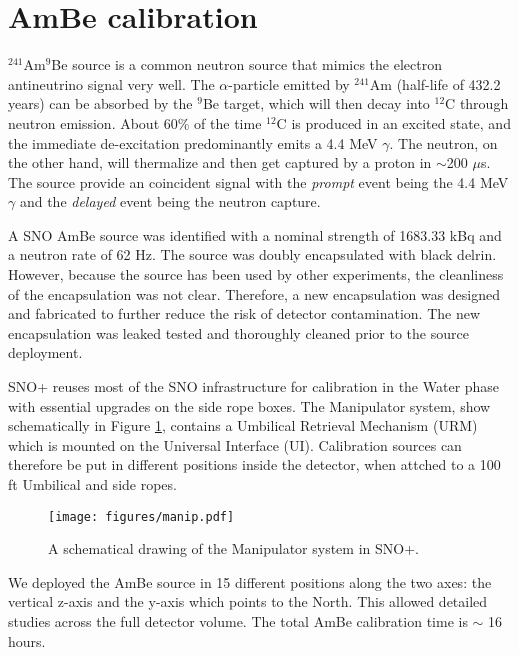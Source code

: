 \documentclass[a4paper]{jpconf}
\begin{document}
\section{AmBe calibration}


$^{241}$Am$^{9}$Be source is a common neutron source that mimics the electron antineutrino signal very well. The $\alpha$-particle emitted by $^{241}$Am (half-life of 432.2 years) can be absorbed by the $^{9}$Be target, which will then decay into $^{12}$C through neutron emission. About 60\% of the time $^{12}$C is produced in an excited state, and the immediate de-excitation predominantly emits a 4.4 MeV $\gamma$. The neutron, on the other hand, will thermalize and then get captured by a proton in $\sim$200 $\mu$s. The source provide an coincident signal with the \textit{prompt} event being the 4.4 MeV $\gamma$ and the \textit{delayed} event being the neutron capture.

A SNO AmBe source was identified with a nominal strength of 1683.33 kBq and a neutron rate of 62 Hz\cite{jloach2009:diss}. The source was doubly encapsulated with black delrin. However, because the source has been used by other experiments, the cleanliness of the encapsulation was not clear. Therefore, a new encapsulation was designed and fabricated to further reduce the risk of detector contamination. The new encapsulation was leaked tested and thoroughly cleaned prior to the source deployment.

SNO+ reuses most of the SNO infrastructure for calibration\cite{Moffat:2005tq} in the Water phase with essential upgrades on the side rope boxes. The Manipulator system, show schematically in Figure \ref{fig:1}, contains a Umbilical Retrieval Mechanism (URM) which is mounted on the Universal Interface (UI). Calibration sources can therefore be put in different positions inside the detector, when attched to a 100 ft Umbilical and side ropes. 

\begin{figure}[h]
\texttt{[image: figures/manip.pdf]}\hspace{2pc}%
\begin{minipage}[b]{14pc}\caption{\label{fig:1}A schematical drawing of the Manipulator system in SNO+.}
\end{minipage}
\end{figure}

We deployed the AmBe source in 15 different positions along the two axes: the vertical z-axis and the y-axis which points to the North. This allowed detailed studies across the full detector volume. The total AmBe calibration time is $\sim$ 16 hours.
\end{document}
